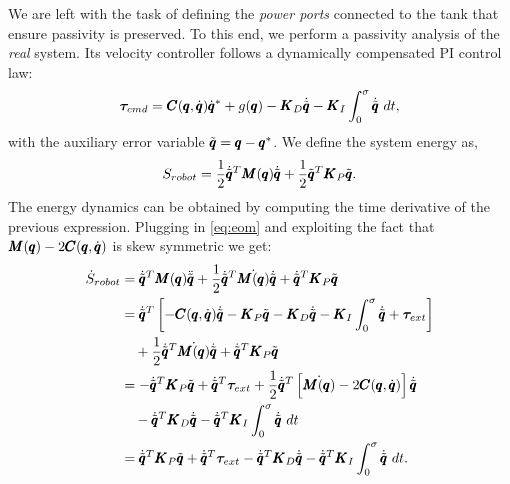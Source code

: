 
We are left with the task of defining the \emph{power ports} connected to the tank that ensure passivity is preserved. To this end, we perform a passivity analysis of the \emph{real} system. Its 
velocity controller follows a dynamically compensated PI control law:
\begin{equation}
\boldsymbol{\tau}_{cmd} = \pmb{C}(\pmb{q}, \dot{\pmb{q}}) \dot{\pmb{q}}^* + g(\pmb{q}) - \pmb{K}_D \dot{\tilde{\pmb{q}}} - \pmb{K}_I \int_{0}^{\sigma} \dot{\tilde{\pmb{q}}}\ dt,
\end{equation}
with the auxiliary error variable $\tilde{\pmb{q}} =  \pmb{q} - \pmb{q}^*$. We define the system energy as, 
\begin{equation}
    S_{robot} = \frac{1}{2} \dot{\tilde{\pmb{q}}}^T \pmb{M}(\pmb{q}) \dot{\tilde{\pmb{q}}} + \frac{1}{2} \tilde{\pmb{q}}^T \pmb{K}_P \tilde{\pmb{q}}.
\end{equation}
The energy dynamics can be obtained by computing the time derivative of the previous expression. Plugging in \eqref{eq:eom} and exploiting the fact that $\pmb{M}(\pmb{q}) - 2 \pmb{C}(\pmb{q}, \dot{\pmb{q}})$ is skew symmetric we get:
\begin{equation*}
\begin{aligned}
    \dot{S}_{robot} &= \dconfigRobotError^T \massMatrix \ddconfigRobotError + \frac{1}{2} \dconfigRobotError^T \dot{\massMatrix} \dconfigRobotError + \dconfigRobotError^T \matr{K}_P \configRobotError \\
    &= \dconfigRobotError^T \left[ -\coriolis \dconfigRobotError - \matr{K}_P \configRobotError - \matr{K}_D \dconfigRobotError - \matr{K}_I \int_{0}^{\sigma} \dconfigRobotError + \externalTorque \right] \\
    &\quad + \frac{1}{2} \dconfigRobotError^T \dot{\massMatrix} \dconfigRobotError + \dconfigRobotError^T \matr{K}_P \configRobotError \\
    &= -\dconfigRobotError^T \matr{K}_P \configRobotError + \dconfigRobotError^T \externalTorque + \frac{1}{2} \dconfigRobotError^T\left[ \dot{\massMatrix} - 2\coriolis \right] \dconfigRobotError \\
    &\quad - \dconfigRobotError^T \matr{K}_D \dconfigRobotError  - \dconfigRobotError^T \matr{K}_I \int^{\sigma}_{0} \dconfigRobotError\ dt\\
    &= \dconfigRobotError^T \matr{K}_P \configRobotError + \dconfigRobotError^T \externalTorque - \dconfigRobotError^T \matr{K}_D \dconfigRobotError -  \dconfigRobotError^T \matr{K}_I \int^{\sigma}_{0} \dconfigRobotError\ dt.  
\end{aligned}
\end{equation*}
